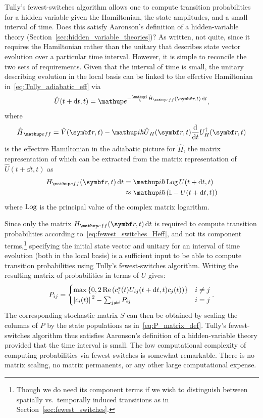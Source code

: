Tully's fewest-switches algorithm allows one to compute transition probabilities for a hidden variable given the Hamiltonian, the state amplitudes, and a small interval of time. Does this satisfy Aaronson's definition of a hidden-variable theory (Section~\ref{sec:hidden_variable_theories})? As written, not quite, since it requires the Hamiltonian rather than the unitary that describes state vector evolution over a particular time interval. However, it is simple to reconcile the two sets of requirements. Given that the interval of time is small, the unitary describing evolution in the local basis can be linked to the effective Hamiltonian in~\eqref{eq:Tully_adiabatic_eff} via
\begin{align}
\hat U(t+\dd t, t) = \ee^{-\frac\ii\hbar\hat H_\up{eff}(\vec r, t)\,\dd t},
\end{align}
where
\begin{align}
\hat H_\up{eff} = \hat V(\vec r, t)
  - \ii\hbar\hat U_H(\vec r, t)\dv{t}U^\dagger_H(\vec r, t)
\end{align}
is the effective Hamiltonian in the adiabatic picture for $\hat H$, the matrix representation of which can be extracted from the matrix representation of $\hat U(t+\dd t, t)$ as
\begin{align}
H_\up{eff}(\vec r, t)\,\dd t &= \ii\hbar\Log U(t+\dd t, t)\\
&\approx \ii\hbar\left(\mathbb{I} -  U(t+\dd t, t)\right)
\end{align}
where $\operatorname{Log}$ is the principal value of the complex matrix logarithm.

Since only the matrix $H_\up{eff}(\vec r, t)\,\dd t$ is required to compute transition probabilities according to~\eqref{eq:fewest_switches_Heff}, and not its component terms,\footnote{Though we do need its component terms if we wish to distinguish between spatially vs.\ temporally induced transitions as in Section~\ref{sec:fewest_switches}.} specifying the initial state vector and unitary for an interval of time evolution (both in the local basis) is a sufficient input to be able to compute transition probabilities using Tully's fewest-switches algorithm. Writing the resulting matrix of probabilities in terms of $U$ gives:
\begin{align}
P_{ij} = \begin{cases}
\max\left\{0, 2\re\left(c_i^*(t)U_{ij}(t + \dd t, t)c_j(t)\right)\right\} & i \neq j\\
\abs{c_i(t)}^2 - \sum_{j\neq i} P_{ij} & i = j
\end{cases}.
\end{align}
The corresponding stochastic matrix $S$ can then be obtained by scaling the columns of $P$ by the state populations as in~\eqref{eq:P_matrix_def}. Tully's fewest-switches algorithm thus satisfies Aaronson's definition of a hidden-variable theory provided that the time interval is small. The low computational complexity of computing probabilities via fewest-switches is somewhat remarkable. There is no matrix scaling, no matrix permanents, or any other large computational expense.


